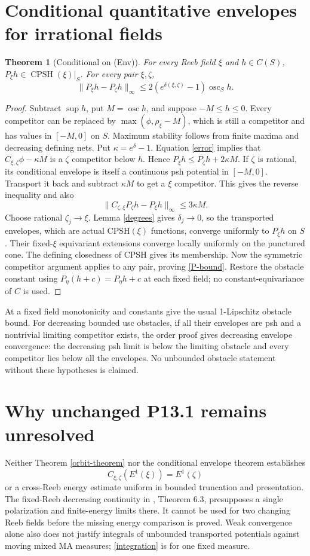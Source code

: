 \documentclass[11pt]{article}
\newtheorem{theorem}{Theorem}
\newcommand{\CPSH}{\operatorname{CPSH}}
\newcommand{\osc}{\operatorname{osc}}
\begin{document}
\section{Conditional quantitative envelopes for irrational fields}
\begin{theorem}[Conditional on (Env)]\label{envelopes}
For every Reeb field $\xi$ and $h\in C(S)$, $P_\xi h\in\CPSH(\xi)|_S$.
For every pair $\xi,\zeta$,
\begin{equation}\label{P-bound}
 \|P_\xi h-P_\zeta h\|_\infty\leq
 2(e^{\delta(\xi,\zeta)}-1)\osc_S h.
\end{equation}
\end{theorem}
\begin{proof}
Subtract $\sup h$, put $M=\osc h$, and suppose $-M\leq h\leq0$.
Every competitor can be replaced by $\max(\phi,\rho_\xi-M)$, which is still a competitor and has values in $[-M,0]$ on $S$.
Maximum stability follows from finite maxima and decreasing defining nets.
Put $\kappa=e^\delta-1$.
Equation \eqref{error} implies that $C_{\xi,\zeta}\phi-\kappa M$ is a $\zeta$ competitor below $h$.
Hence $P_\xi h\leq P_\zeta h+2\kappa M$.
If $\zeta$ is rational, its conditional envelope is itself a continuous psh potential in $[-M,0]$.
Transport it back and subtract $\kappa M$ to get a $\xi$ competitor.
This gives the reverse inequality and also
\[
 \|C_{\zeta,\xi}P_\zeta h-P_\xi h\|_\infty\leq3\kappa M.
\]
Choose rational $\zeta_j\to\xi$.
Lemma \ref{degrees} gives $\delta_j\to0$, so the transported envelopes, which are actual CPSH$(\xi)$ functions, converge uniformly to $P_\xi h$ on $S$.
Their fixed-$\xi$ equivariant extensions converge locally uniformly on the punctured cone.
The defining closedness of CPSH gives its membership.
Now the symmetric competitor argument applies to any pair, proving \eqref{P-bound}.
Restore the obstacle constant using $P_\eta(h+c)=P_\eta h+c$ at each fixed field; no constant-equivariance of $C$ is used.
\end{proof}
At a fixed field monotonicity and constants give the usual 1-Lipschitz obstacle bound.
For decreasing bounded usc obstacles, if all their envelopes are psh and a nontrivial limiting competitor exists, the order proof gives decreasing envelope convergence: the decreasing psh limit is below the limiting obstacle and every competitor lies below all the envelopes.
No unbounded obstacle statement without these hypotheses is claimed.

\section{Why unchanged P13.1 remains unresolved}
Neither Theorem \ref{orbit-theorem} nor the conditional envelope theorem establishes
\[
 C_{\xi,\zeta}(E^1(\xi))=E^1(\zeta)
\]
or a cross-Reeb energy estimate uniform in bounded truncation and presentation.
The fixed-Reeb decreasing continuity in \cite{YW24}, Theorem 6.3, presupposes a single polarization and finite-energy limits there.
It cannot be used for two changing Reeb fields before the missing energy comparison is proved.
Weak convergence alone also does not justify integrals of unbounded transported potentials against moving mixed MA measures; \eqref{integration} is for one fixed measure.
\end{document}
